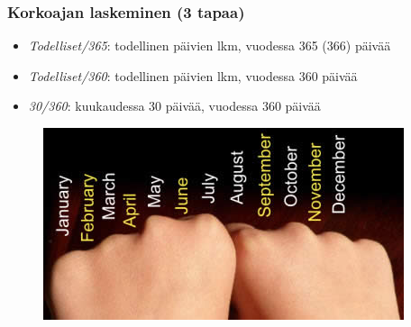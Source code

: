 \documentclass[handout]{beamer}\usepackage[]{graphicx}\usepackage[]{color}
\theoremstyle{remark}
\newtheorem{esim}{Esimerkki}
\newtheorem{ratkaisu}{Ratkaisuehdotus}
\begin{document}
\begin{frame}
    \frametitle{Korkoajan laskeminen (3 tapaa)}
    \begin{itemize}
        \item \emph{Todelliset/365}: todellinen päivien lkm, vuodessa 365 (366) päivää
        \item \emph{Todelliset/360}: todellinen päivien lkm, vuodessa 360 päivää
        \item \emph{30/360}: kuukaudessa 30 päivää, vuodessa 360 päivää
    \end{itemize}
    \pause
    \begin{figure}
        \includegraphics[scale=0.7]{months}
    \end{figure}
\end{frame}


% 
\end{document}
